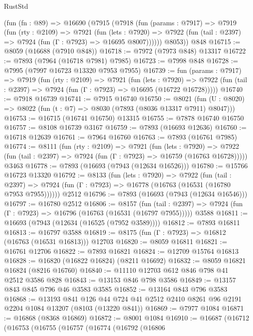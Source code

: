 \begin{lexlean}{RustStd}
\begin{coremodule}
    (fun (fn : @89) =>
    @16690
      (@7915
        (@7918
          (fun (params : @7917) =>
          @7919
            (fun (rty : @2109) =>
            @7921
              (fun (lets : @7920) =>
              @7922 (fun (tail : @2397) => @7924 (fun (Γ : @7923) => @16695 @8007))))))
        @8053))
    @848
@16715 := @8059 (@16688 (@7910 @848))
@16718 := @7972 (@7973 @848) @13317
@16722 := @7893 (@7964 (@16718 @7981) @7985)
@16723 := @7998 @848
@16728 := @7995 (@7997 @16723 @13320 @7953 @7955)
@16739 := fun (params : @7917) =>
  @7919
    (fun (rty : @2109) =>
    @7921
      (fun (lets : @7920) =>
      @7922 (fun (tail : @2397) => @7924 (fun (Γ : @7923) => @16695 (@16722 @16728)))))
@16740 := @7918 @16739
@16741 := @7915 @16740
@16750 := @8021
    (fun (U : @8020) => @8022 (fun (t : @7) => @8030 (@7893 (@8036 @13317 @7911) @8047)))
@16753 := @16715 (@16741 @16750) @13315
@16755 := @7878 @16740 @16750
@16757 := @8108 @16739 @3167
@16759 := @7893 (@16693 @12636)
@16760 := @16718 @12639
@16761 := @7964 @16760
@16763 := @7893 (@16761 @7985)
@16774 := @8111
    (fun (rty : @2109) =>
    @7921
      (fun (lets : @7920) =>
      @7922 (fun (tail : @2397) => @7924 (fun (Γ : @7923) => @16759 (@16763 @16728)))))
    @3463
@16778 := @7893 (@16693 (@7943 (@12634 @16526)))
@16780 := @15766 @16723 @13320
@16792 := @8133
    (fun (lets : @7920) =>
    @7922
      (fun (tail : @2397) =>
      @7924 (fun (Γ : @7923) => @16778 (@16763 (@16531 (@16780 @7953 @7955))))))
    @2512
@16796 := @7893 (@16693 (@7943 (@12634 @16546)))
@16797 := @16780 @2512
@16806 := @8157
    (fun (tail : @2397) => @7924 (fun (Γ : @7923) => @16796 (@16763 (@16531 (@16797 @7955)))))
    @3588
@16811 := @16693 (@7943 (@12634 (@16525 (@7952 @3589))))
@16812 := @7893 @16811
@16813 := @16797 @3588
@16819 := @8175 (fun (Γ : @7923) => @16812 (@16763 (@16531 @16813))) @12703
@16820 := @8059 @16811
@16821 := @16761 @12706
@16822 := @7893 @16821
@16824 := @12709 @15764 @16813
@16828 := @16820 (@16822 @16824) (@8211 @16692)
@16832 := @8059 @16821 @16824 (@8216 @16760)
@16840 := @11110 @12703 @612 @846 @798 @41 @2512 @3586 @828
@16843 := @13153 @846 @798 @3586
@16849 := @13157 @843 @845 @796 @46 @3583 @3585
@16852 := @13164 @843 @796 @3583
@16868 := @13193
    @841
    @126
    @44
    @724
    @41
    @2512
    @2410
    @8261
    @96
    @2191
    @2204
    @1084
    @13207
    (@8103 (@13220 @841))
@16869 := @7977 @1084
@16871 := @16868 (@8368 @16869)
@16872 := @8001 @1084
@16910 := @16687
    (@16712
      (@16753
        (@16755
          (@16757
            (@16774
              (@16792
                (@16806

\end{coremodule}
\end{lexlean}
